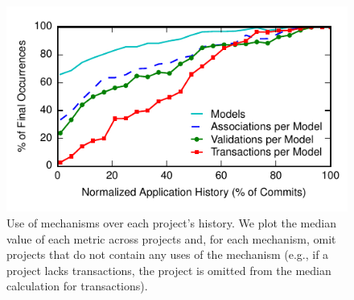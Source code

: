 

\begin{figure}[h!]  \includegraphics[width=\columnwidth]{figs/historical-median.pdf}\vspace{-2em} \caption{Use of mechanisms over each project's history. We plot the median value of each metric across projects and, for each mechanism, omit projects that do not contain any uses of the mechanism (e.g., if a project lacks transactions, the project is omitted from the median calculation for transactions).}  \label{fig:historical} \end{figure}\vspace{-1em}


